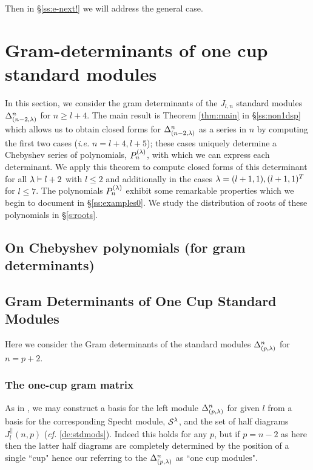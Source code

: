 Then in \S\ref{ss:e-next!} we will address the general case. 



\section{Gram-determinants of one cup standard modules}  \label{s:onecup0}

In this section, we consider the gram determinants of the $J_{l,n}$ standard modules $\Delta_{(n-2,\lambda)}^{n}$ for $n\geq l+4$. The main result is Theorem \ref{thm:main} in \S\ref{ss:non1dsp} which allows us to obtain closed forms for $\Delta_{(n-2,\lambda)}^{n}$ as a series in $n$ by computing the first two cases (\textit{i.e.} $n=l+4,l+5$); these cases uniquely determine a Chebyshev series of polynomials, $P^{(\lambda)}_{n}$, with which we can express each determinant. We apply this theorem to compute closed forms of this determinant for all $\lambda\vdash l+2$ with $l\leq 2$ and additionally in the cases $\lambda=(l+1,1), (l+1,1)^T$ for $l\leq 7$. The polynomials $P^{(\lambda)}_{n}$ exhibit some remarkable properties which we begin to document in \S\ref{ss:examples0}. We study the distribution of roots of these polynomials in \S\ref{s:roots}.

\subsection{On Chebyshev polynomials (for gram determinants)}  \label{ss:cheby0}


\subsection{Gram Determinants of One Cup Standard Modules}\label{ss:onecup0}
Here we consider the Gram determinants of the standard modules $\Delta_{(p, \lambda)}^{n}$ for $n=p+2$. 

\subsubsection{The one-cup gram matrix}    \label{ss:gram-mat}


As in \cite[Prop. 4.22]{KadarYu}, we may construct a basis for 
the left module 
$\Delta^{n}_{(p, \lambda)}$ 
for given $l$ 
from a basis for the corresponding Specht module, $\mathcal{S}^{\lambda}$, and the set of half diagrams $J^{||}_{l}(n,p)$ (\textit{cf.} \ref{de:stdmods}). 
Indeed this holds for any $p$, but if $p=n-2$ as here then the latter half diagrams are completely determined by the position of a single ``cup" hence our referring to the $\Delta_{(p, \lambda)}^{n}$ as ``one cup modules". 


